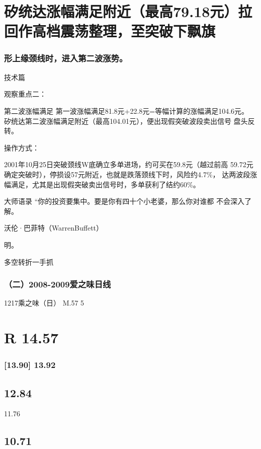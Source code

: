 \documentclass{article}
\begin{document}
\section{矽统达涨幅满足附近（最高79.18元）拉回作高档震荡整理，至突破下飘旗}

\subsubsection{形上缘颈线时，进入第二波涨势。}

\clearpage

技术篇

观察重点二：

第二波涨幅满足 第一波涨幅满足81.8元+22.8元=等幅计算的涨幅满足104.6元。 矽统达第二波涨幅满足附近（最高104.01元），便出现假突破波段卖出信号 盘头反转。

操作方式：

2001年10月25日突破颈线W底确立多单进场，约可买在59.8元（越过前高 59.72元确定突破时），停损设57元附近，也就是跌落颈线下时，风险约4.7\%， 达两波段涨幅满足，尤其是出现假突破卖出信号时，多单获利了结约60\%。

大师语录 “你的投资要集中。要是你有四十个小老婆，那么你对谁都 不会深入了解。

沃伦·巴菲特（WarrenBuffett）

明。

\clearpage

多空转折一手抓

\subsubsection{（二）2008-2009爱之味日线}

1217乘之味（日） M.57 5

\section{R 14.57}

\subsubsection{[13.90] 13.92}

\subsection{12.84}

11.76

\subsection{10.71}
\end{document}
